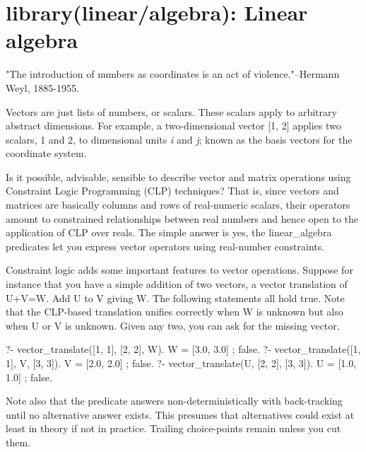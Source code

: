 \chapter{library(linear/algebra): Linear algebra}\label{sec:algebra}

"The introduction of numbers as coordinates is an act of
violence."--Hermann Weyl, 1885-1955.

Vectors are just lists of numbers, or scalars. These scalars apply to
arbitrary abstract dimensions. For example, a two-dimensional vector
[1, 2] applies two scalars, 1 and 2, to dimensional units \textit{i} and
\textit{j}; known as the basis vectors for the coordinate system.

Is it possible, advisable, sensible to describe vector and matrix
operations using Constraint Logic Programming (CLP) techniques? That
is, since vectors and matrices are basically columns and rows of
real-numeric scalars, their operators amount to constrained
relationships between real numbers and hence open to the application
of CLP over reals. The simple answer is yes, the linear_algebra
predicates let you express vector operators using real-number
constraints.

Constraint logic adds some important features to vector operations.
Suppose for instance that you have a simple addition of two vectors,
a vector translation of U+V=W. Add U to V giving W. The following
statements all hold true. Note that the CLP-based translation unifies
correctly when W is unknown but also when U or V is unknown. Given
any two, you can ask for the missing vector.

\begin{code}
?- vector_translate([1, 1], [2, 2], W).
W = [3.0, 3.0] ;
false.
?- vector_translate([1, 1], V, [3, 3]).
V = [2.0, 2.0] ;
false.
?- vector_translate(U, [2, 2], [3, 3]).
U = [1.0, 1.0] ;
false.
\end{code}

Note also that the predicate answers non-deterministically with
back-tracking until no alternative answer exists. This presumes that
alternatives could exist at least in theory if not in practice.
Trailing choice-points remain unless you cut them.\vspace{0.7cm}

